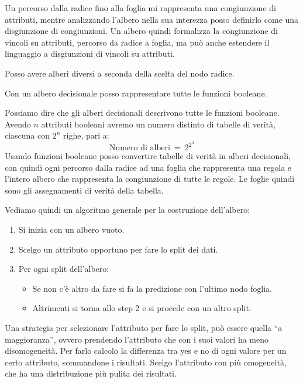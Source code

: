 Un percorso dalla radice fino alla foglia mi rappresenta una congiunzione di
attributi, mentre analizzando l'albero nella sua interezza posso definirlo come
una disgiunzione di congiunzioni. Un albero quindi formalizza la congiunzione di
vincoli su attributi, percorso da radice a foglia, ma può anche estendere il
linguaggio a disgiunzioni di vincoli su attributi.

Posso avere alberi diversi a seconda della scelta del nodo radice.
\begin{teorema}
    Con un albero decisionale posso rappresentare tutte le funzioni booleane.
\end{teorema}

Possiamo dire che gli alberi decisionali descrivono tutte le funzioni booleane.
Avendo $n$ attributi booleani avremo un numero distinto di tabelle di verità,
ciascuna con $2^n$ righe, pari a:
\begin{equation}
    \text{Numero di alberi} \ = \ 2^{2^n}
\end{equation}
Usando funzioni booleane posso convertire tabelle di verità in alberi decisionali,
con quindi ogni percorso dalla radice ad una foglia che rappresenta una regola e
l'intero albero che rappresenta la congiunzione di tutte le regole. Le foglie
quindi sono gli assegnamenti di verità della tabella.

Vediamo quindi un algoritmo generale per la costruzione dell'albero:
\begin{enumerate}
    \item Si inizia con un albero vuoto.
    \item Scelgo un attributo opportuno per fare lo split dei dati.
    \item Per ogni split dell'albero:
          \begin{itemize}
              \item Se non c'è altro da fare si fa la predizione con l'ultimo nodo
                    foglia.
              \item Altrimenti si torna allo step 2 e si procede con un altro split.
          \end{itemize}
\end{enumerate}

Una strategia per selezionare l'attributo per fare lo split, può essere quella
“a maggioranza”, ovvero prendendo l'attributo che con i suoi valori ha meno
disomogeneità. Per farlo calcolo la differenza tra yes e no di ogni valore per
un certo attributo, sommandone i risultati. Scelgo l'attributo con più omogeneità,
che ha una distribuzione più pulita dei risultati.

